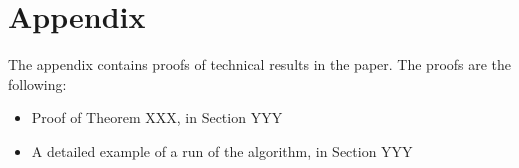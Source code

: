 \section*{Appendix}
The appendix contains proofs of technical results in the paper.
The proofs are the following:
\begin{itemize}
\item
Proof of Theorem XXX, in Section YYY
\item
A detailed example of a run of the algorithm, in Section YYY
\end{itemize}

